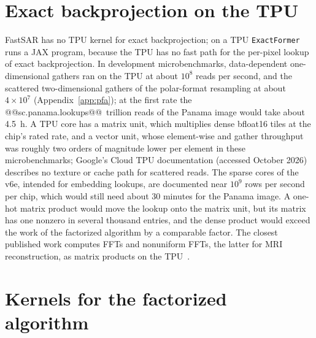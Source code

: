 \documentclass[11pt]{article}
\begin{document}
\section{Exact backprojection on the TPU}
\label{app:tpu}

FastSAR has no TPU kernel for exact backprojection; on a TPU \texttt{ExactFormer} runs a JAX program, because the TPU has no fast path for the per-pixel lookup of exact backprojection. In development microbenchmarks, data-dependent one-dimensional gathers ran on the TPU at about $10^8$ reads per second, and the scattered two-dimensional gathers of the polar-format resampling at about $4 \times 10^7$ (Appendix~\ref{app:pfa}); at the first rate the @@sc.panama.lookups@@~trillion reads of the Panama image would take about 4.5~h. A TPU core has a matrix unit, which multiplies dense bfloat16 tiles at the chip's rated rate, and a vector unit, whose element-wise and gather throughput was roughly two orders of magnitude lower per element in these microbenchmarks; Google's Cloud TPU documentation (accessed October 2026) describes no texture or cache path for scattered reads. The sparse cores of the v6e, intended for embedding lookups, are documented near $10^9$ rows per second per chip, which would still need about 30 minutes for the Panama image. A one-hot matrix product would move the lookup onto the matrix unit, but its matrix has one nonzero in several thousand entries, and the dense product would exceed the work of the factorized algorithm by a comparable factor. The closest published work computes FFTs and nonuniform FFTs, the latter for MRI reconstruction, as matrix products on the TPU~\cite{lu2020,lu2021}.

\section{Kernels for the factorized algorithm}
\label{app:kernels}
\end{document}
